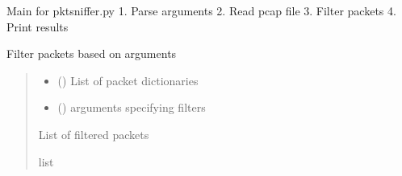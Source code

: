 \documentclass[letterpaper,10pt,english]{sphinxmanual}
\begin{document}

\begin{fulllineitems}
\label{\detokenize{pktsniffer:pktsniffer.main}}
\pysigstartsignatures
\pysiglinewithargsret
{}
{}
{}
\pysigstopsignatures
\sphinxAtStartPar
Main for pktsniffer.py
1. Parse arguments
2. Read pcap file
3. Filter packets
4. Print results

\end{fulllineitems}


\begin{fulllineitems}
\label{\detokenize{pktsniffer:pktsniffer.packet_filter}}
\pysigstartsignatures
\pysiglinewithargsret
{}
{\sphinxparamcomma {}}
{}
\pysigstopsignatures
\sphinxAtStartPar
Filter packets based on arguments
\begin{quote}\begin{description}
\begin{itemize}
\item {} 
\sphinxAtStartPar
{} () \textendash{} List of packet dictionaries

\item {} 
\sphinxAtStartPar
{} () \textendash{} arguments specifying filters

\end{itemize}

\sphinxAtStartPar
List of filtered packets

\sphinxAtStartPar
list

\end{description}\end{quote}

\end{fulllineitems}

\end{document}
